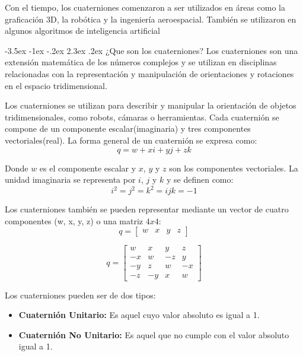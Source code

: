 \documentclass[11pt]{report}
\makeatletter
\renewcommand\chapter{\@startsection{chapter}{0}{\z@}%
    {-3.5ex \@plus -1ex \@minus -.2ex}%
    {2.3ex \@plus.2ex}%
    {\normalfont\Large\bfseries}}
\makeatother
\begin{document}
Con el tiempo, los cuaterniones comenzaron a ser utilizados en áreas como la
graficación 3D, la robótica y la ingeniería aeroespacial. También se utilizaron en
algunos algoritmos de inteligencia artificial

\newpage

\chapter{¿Que son los cuaterniones?}
Los cuaterniones son una extensión matemática de los números complejos y se utilizan en disciplinas relacionadas
con la representación y manipulación de orientaciones y rotaciones en el espacio tridimensional.

Los cuaterniones se utilizan para describir y manipular la orientación de objetos tridimensionales, como
robots, cámaras o herramientas. Cada cuaternión se compone de un componente escalar(imaginaria) y tres componentes
vectoriales(real). La forma general de un cuaternión se expresa como:
\begin{equation*}
  q = w + xi + yj + zk
\end{equation*}

Donde $w$ es el componente escalar y $x$, $y$ y $z$ son los componentes vectoriales. La unidad imaginaria
se representa por $i$, $j$ y $k$ y se definen como:
\begin{equation*}
  i^2 = j^2 = k^2 = ijk = -1
\end{equation*}

Los cuaterniones también se pueden representar mediante un vector de cuatro componentes (w, x, y, z) o una matriz $4x4$:
\begin{equation*}
  q = \begin{bmatrix}
    w & x & y & z
  \end{bmatrix}
\end{equation*}

\begin{equation*}
  q = \begin{bmatrix}
    w  & x  & y  & z  \\
    -x & w  & -z & y  \\
    -y & z  & w  & -x \\
    -z & -y & x  & w
  \end{bmatrix}
\end{equation*}

Los cuaterniones pueden ser de dos tipos:
\begin{itemize}
  \item \textbf{Cuaternión Unitario:} Es aquel cuyo valor absoluto es igual a 1.
  \item \textbf{Cuaternión No Unitario:} Es aquel que no cumple con el valor absoluto igual a 1.
\end{itemize}
\end{document}
